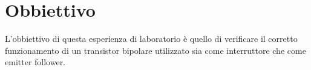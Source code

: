 \section*{Obbiettivo}

L'obbiettivo di questa esperienza di laboratorio è quello di verificare il corretto funzionamento di un transistor bipolare utilizzato sia come interruttore che come emitter follower.
